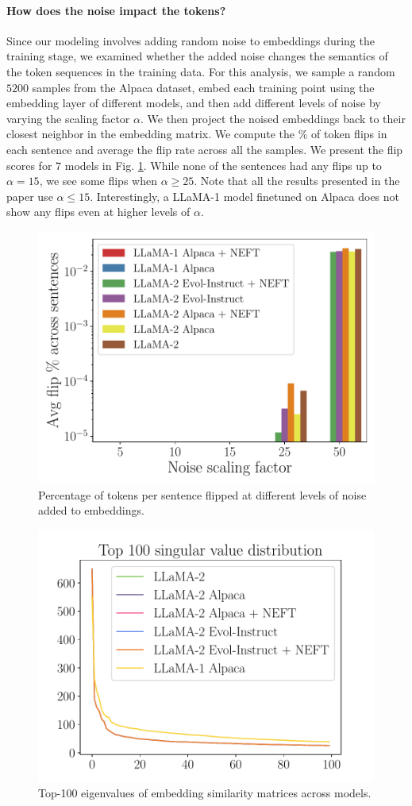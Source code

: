 \documentclass{article} %
\newcommand{\llama}{LLaMA}
\begin{document}
\paragraph{How does the noise impact the tokens?} Since our modeling involves adding random noise to embeddings during the training stage, we examined whether the added noise changes the semantics of the token sequences in the training data. For this analysis, we sample a random $5200$ samples from the Alpaca dataset, embed each training point using the embedding layer of different models, and then add different levels of noise by varying the scaling factor $\alpha$. We then project the noised embeddings back to their closest neighbor in the embedding matrix. We compute the $\%$ of token flips in each sentence and average the flip rate across all the samples. We present the flip scores for $7$ models in Fig. \ref{appendix_fig:noise_impact}. While none of the sentences had any flips up to $\alpha=15$, we see some flips when $\alpha \geq 25$. Note that all the results presented in the paper use $\alpha \leq 15$. Interestingly, a \llama{}-1 model finetuned on Alpaca does not show any flips even at higher levels of $\alpha$.

\begin{figure}
    \centering
     \includegraphics[width=0.55\linewidth]{figures/figs_appendix/flip_percent_alpacadata.pdf}

    \caption{Percentage of tokens per sentence flipped at different levels of noise added to embeddings.}
    \label{appendix_fig:noise_impact}
\end{figure}

\begin{figure}
    \centering
    \includegraphics[width=.45\linewidth]{figures/figs_appendix/singularvals.pdf}
    \caption{Top-100 eigenvalues of embedding similarity matrices across models.}
    \label{fig:singular_values}
\end{figure}
\end{document}
